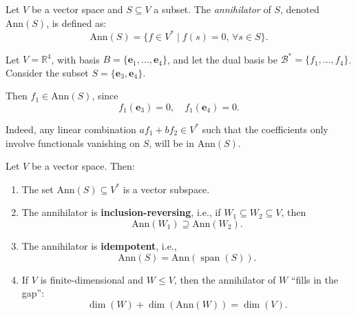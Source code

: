 \begin{definition}[Annihilator]\label{def:annihilator}
Let \( V \) be a vector space and \( S \subseteq V \) a subset. The \emph{annihilator} of \( S \), denoted \( \mathrm{Ann}(S) \), is defined as:
\[
\mathrm{Ann}(S) = \{ f \in V^* \mid f(s) = 0, \, \forall s \in S \}.
\]
\end{definition}

\begin{example}
Let \( V = \mathbb{R}^4 \), with basis \( B = \{ \mathbf{e}_1, \dots, \mathbf{e}_4 \} \), and let the dual basis be \( \mathcal{B}^* = \{ f_1, \dots, f_4 \} \). Consider the subset \( S = \{ \mathbf{e}_3, \mathbf{e}_4 \} \).

Then \( f_1 \in \mathrm{Ann}(S) \), since
\[
f_1(\mathbf{e}_3) = 0, \quad f_1(\mathbf{e}_4) = 0.
\]

Indeed, any linear combination \( a f_1 + b f_2 \in V^* \) such that the coefficients only involve functionals vanishing on \( S \), will be in \( \mathrm{Ann}(S) \).
\end{example}

\begin{proposition}\label{prop:annihilator-properties}
Let \( V \) be a vector space. Then:
\begin{enumerate}
  \item The set \( \mathrm{Ann}(S) \subseteq V^* \) is a vector subspace.
  \item The annihilator is \textbf{inclusion-reversing}, i.e., if \( W_1 \subseteq W_2 \subseteq V \), then
  \[
  \mathrm{Ann}(W_1) \supseteq \mathrm{Ann}(W_2).
  \]
  \item The annihilator is \textbf{idempotent}, i.e.,
  \[
  \mathrm{Ann}(S) = \mathrm{Ann}(\operatorname{span}(S)).
  \]
  \item If \( V \) is finite-dimensional and \( W \leq V \), then the annihilator of \( W \) “fills in the gap”:
  \[
  \dim(W) + \dim(\mathrm{Ann}(W)) = \dim(V).
  \]
\end{enumerate}
\end{proposition}


